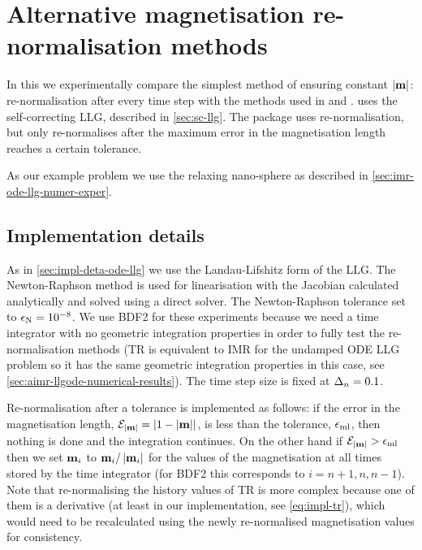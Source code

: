 
\FloatBarrier
\chapter{Alternative magnetisation re-normalisation methods}
\label{sec:magn-renorm-meth}

In this  we experimentally compare the simplest method of ensuring constant $\left|{\boldsymbol{\mathrm{m}}} \right|$: re-normalisation after every time step with the methods used in \nmag and \magpar.
\nmag uses the self-correcting LLG, described in \cref{sec:sc-llg}.
The \magpar package uses re-normalisation, but only re-normalises after the maximum error in the magnetisation length reaches a certain tolerance.

As our example problem we use the relaxing nano-sphere as described in \cref{sec:imr-ode-llg-numer-exper}.


\section{Implementation details}

As in \cref{sec:impl-deta-ode-llg} we use the Landau-Lifshitz form of the LLG.
The Newton-Raphson method is used for linearisation with the Jacobian calculated analytically and solved using a direct solver.
The Newton-Raphson tolerance set to $\epsilon_{\mathrm{N}} = 10^{-8}$.
We use BDF2 for these experiments because we need a time integrator with no geometric integration properties in order to fully test the re-normalisation methods (TR is equivalent to IMR for the undamped ODE LLG problem so it has the same geometric integration properties in this case, see \cref{sec:aimr-llgode-numerical-results}).
The time step size is fixed at $\Delta_{n} = 0.1$.

Re-normalisation after a tolerance is implemented as follows:
if the error in the magnetisation length, $\mathcal{E}_{\left|{\boldsymbol{\mathrm{m}}} \right|} = \left|{1 - \left|{\boldsymbol{\mathrm{m}}} \right|} \right|$, is less than the tolerance, $\epsilon_{\mathrm{ml}}$, then nothing is done and the integration continues.
On the other hand if $\mathcal{E}_{\left|{\boldsymbol{\mathrm{m}}} \right|} > \epsilon_{\mathrm{ml}}$ then we set $\boldsymbol{\mathrm{m}}_{i}$ to $\boldsymbol{\mathrm{m}}_{i}/\left|{\boldsymbol{\mathrm{m}}_{i}} \right|$ for the values of the magnetisation at all times stored by the time integrator (for BDF2 this corresponds to $i=n+1, n, n-1$).
Note that re-normalising the history values of TR is more complex because one of them is a derivative (at least in our implementation, see \cref{eq:impl-tr}), which would need to be recalculated using the newly re-normalised magnetisation values for consistency.

